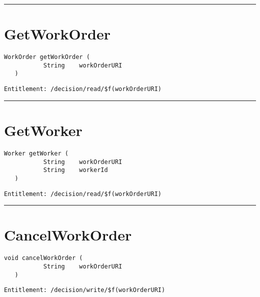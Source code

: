 \rule{12cm}{2pt}
\section{GetWorkOrder}
\label{Api:GetWorkOrder}
\begin{lstlisting}[style=nonumbers]
   WorkOrder getWorkOrder (
           String    workOrderURI
   )
\end{lstlisting}
\begin{Verbatim}[formatcom=\color{Maroon}]
  Entitlement: /decision/read/$f(workOrderURI)
\end{Verbatim}



\rule{12cm}{2pt}
\section{GetWorker}
\label{Api:GetWorker}
\begin{lstlisting}[style=nonumbers]
   Worker getWorker (
           String    workOrderURI
           String    workerId
   )
\end{lstlisting}
\begin{Verbatim}[formatcom=\color{Maroon}]
  Entitlement: /decision/read/$f(workOrderURI)
\end{Verbatim}



\rule{12cm}{2pt}
\section{CancelWorkOrder}
\label{Api:CancelWorkOrder}
\begin{lstlisting}[style=nonumbers]
   void cancelWorkOrder (
           String    workOrderURI
   )
\end{lstlisting}
\begin{Verbatim}[formatcom=\color{Maroon}]
  Entitlement: /decision/write/$f(workOrderURI)
\end{Verbatim}



